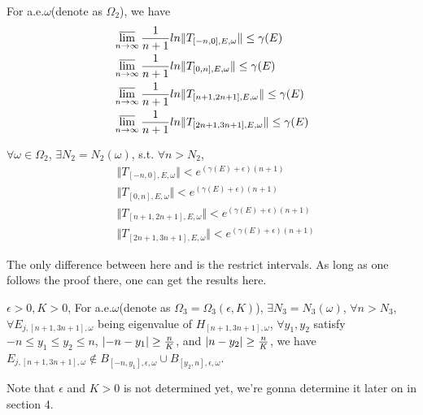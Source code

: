 \begin{thm}
  For a.e.$\omega$(denote as $\Omega_2$), we have
  \[
    \begin{aligned}
      &\varlimsup_{n\to\infty} \frac{1}{n+1} ln\Vert T_{[-n,0],E,\omega}\Vert\leq\gamma(E)\\
      &\varlimsup_{n\to\infty} \frac{1}{n+1} ln\Vert T_{[0,n],E,\omega}\Vert\leq\gamma(E)\\
      &\varlimsup_{n\to\infty} \frac{1}{n+1} ln\Vert T_{[n+1,2n+1],E,\omega}\Vert\leq\gamma(E)\\
      &\varlimsup_{n\to\infty} \frac{1}{n+1} ln\Vert T_{[2n+1,3n+1],E,\omega}\Vert\leq\gamma(E)
    \end{aligned}
  \]
\end{thm}
\begin{cor}\label{omega2}
  $\forall \omega\in\Omega_2$, $\exists N_2=N_2(\omega)$, s.t. $\forall n>N_2$,
  \[
    \begin{aligned}
      &\Vert T_{[-n,0],E,\omega}\Vert< e^{(\gamma(E)+\epsilon)(n+1)}\\
      &\Vert T_{[0,n],E,\omega}\Vert< e^{(\gamma(E)+\epsilon)(n+1)}\\
      &\Vert T_{[n+1,2n+1],E,\omega}\Vert< e^{(\gamma(E)+\epsilon)(n+1)}\\
      &\Vert T_{[2n+1,3n+1],E,\omega}\Vert< e^{(\gamma(E)+\epsilon)(n+1)}
    \end{aligned}
  \]
\end{cor}
\begin{remark}
  The only difference between here and \cite{craig1983subharmonicity} is the restrict intervals. As long as one follows the proof there, one can get the results here.
\end{remark}
\begin{thm}\label{omega3}
   $\epsilon>0,K>0$, For a.e.$\omega$(denote as $\Omega_3=\Omega_3(\epsilon,K)$), $\exists N_3=N_3(\omega)$, $\forall n>N_3$, $\forall E_{j,[n+1,3n+1],\omega}$ being eigenvalue of $H_{[n+1,3n+1],\omega}$, $\forall y_1,y_2$ satisfy $-n\leq y_1\leq y_2\leq n$,  $\lvert-n-y_1\rvert\geq\frac{n}{K}$, and $\lvert n-y_2\rvert\geq\frac{n}{K}$,
 we have $E_{j,[n+1,3n+1],\omega}\notin B_{[-n,y_1],\epsilon,\omega}\cup B_{[y_2,n],\epsilon,\omega}$.
\end{thm}
\begin{remark}
  Note that $\epsilon$ and $K>0$ is not determined yet, we're gonna determine it later on in section 4.
\end{remark}


